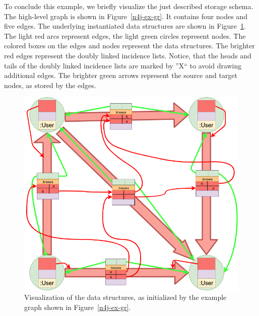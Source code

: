         To conclude this example, we briefly visualize the just described storage schema. 
        The high-level graph is shown in Figure~\ref{n4j-ex-gr}.
        It contains four nodes and five edges.
        The underlying instantiated data structures are shown in Figure~\ref{n4j-ex}.
        The light red arcs represent edges, the light green circles represent nodes.
        The colored boxes on the edges and nodes represent the data structures.
        The brighter red edges represent the doubly linked incidence lists.
        Notice, that the heads and tails of the doubly linked incidence lists are marked by ''X`` to avoid drawing additional edges.
        The brighter green arrows represent the source and target nodes, as stored by the edges.
        \vfill
        \begin{figure}[htp]
            \begin{center}
                \includegraphics[keepaspectratio,height=\textheight,width=\textwidth]{img/04-databases/example_structs.png}
            \end{center}
            \caption{Visualization of the data structures, as initialized by the example graph shown in Figure~\ref{n4j-ex-gr}.}
            \label{n4j-ex}
        \end{figure}
        \vfill
